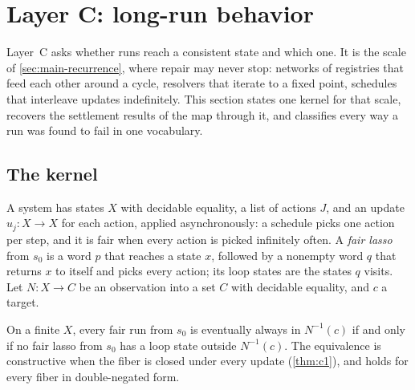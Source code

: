 
\section{Layer C: long-run behavior}\label{sec:layer-c}

Layer~C asks whether runs reach a consistent state and which one. It is the scale of
\cref{sec:main-recurrence}, where repair may never stop: networks of registries that feed each other
around a cycle, resolvers that iterate to a fixed point, schedules that interleave updates
indefinitely. This section states one kernel for that scale, recovers the settlement results of the
map through it, and classifies every way a run was found to fail in one vocabulary.

\subsection{The kernel}

A system has states $X$ with decidable equality, a list of actions $J$, and an update $u_j : X \to X$
for each action, applied asynchronously: a schedule picks one action per step, and it is fair when
every action is picked infinitely often. A \emph{fair lasso} from $s_0$ is a word $p$ that reaches a
state $x$, followed by a nonempty word $q$ that returns $x$ to itself and picks every action; its loop
states are the states $q$ visits. Let $N : X \to C$ be an observation into a set $C$ with decidable equality, and $c$ a target.

\begin{theorem}\label{thm:c1-kernel}
On a finite $X$, every fair run from $s_0$ is eventually always in $N^{-1}(c)$ if and only if no fair
lasso from $s_0$ has a loop state outside $N^{-1}(c)$. The equivalence is constructive when the fiber
is closed under every update (\cref{thm:c1}), and holds for every fiber in double-negated form.
\end{theorem}

